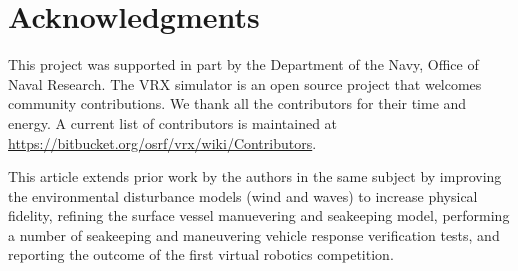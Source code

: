 \documentclass[utf8]{frontiersSCNS} %
\newif\ifoverleaf %
\begin{document}

\section*{Acknowledgments}
This project was supported in part by the Department of the Navy, Office of Naval Research.  The VRX simulator is an open source project that welcomes community contributions.  We thank all the contributors for their time and energy.  A current list of contributors is maintained at \url{https://bitbucket.org/osrf/vrx/wiki/Contributors}.

This article extends prior work by the authors in the same subject \citep{bingham19toward} by improving the environmental disturbance models (wind and waves) to increase physical fidelity, refining the surface vessel manuevering and seakeeping model, \color{red} performing a number of seakeeping and maneuvering vehicle response verification tests, \color{black} and reporting the outcome of the first virtual robotics competition.

 

\ifoverleaf

\else

\fi
\end{document}
